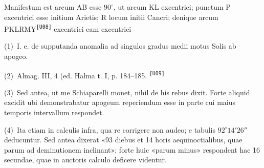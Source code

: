 \documentclass[10pt,a4paper]{article}
\newcommand{\A}[1]{\hypertarget{#1}{}}
\newcommand{\NN}[2]{%
  \par\noindent\textup{(#1)}\ #2%
}
\newcommand{\U}[2]{%
  #2\textsuperscript{\texttt{[#1]}}%
}
\begin{document}
\A{AB01-PDF0132-P05}
Manifestum est arcum AB esse $90^\circ$, ut arcum KL excentrici;
punctum P excentrici esse initium Arietis; R locum initii Cancri;
denique arcum \U{U08}{PKLRMY} excentrici eam excentrici


\begin{multicols}{2}
\footnotesize

\A{AB01-PDF0132-N01}
\NN{1}{I. e. de supputanda anomalia ad singulos gradus medii
motus Solis ab apogeo.}

\A{AB01-PDF0132-N02}
\NN{2}{Almag. III, 4 (ed. Halma t. I, p. 184--185.%
\textsuperscript{\texttt{[U09]}}}

\A{AB01-PDF0132-N03}
\NN{3}{Sed antea, ut me Schiaparelli monet, nihil de his rebus
dixit. Forte aliquid excidit ubi demonstrabatur apogeum
reperiendum esse in parte cui maius temporis intervallum
respondet.}

\A{AB01-PDF0132-N04}
\NN{4}{Ita etiam in calculis infra, qua re corrigere non audeo;
e tabulis $92^\circ14'26''$ deducuntur. Sed antea dixerat
«93 diebus et 14 horis aequinoctialibus, quae parum ad
deminutionem inclinant»; forte huic «parum minus» respondent
hae 16 secundae, quae in auctoris calculo deficere videntur.}

\end{multicols}
\end{document}
